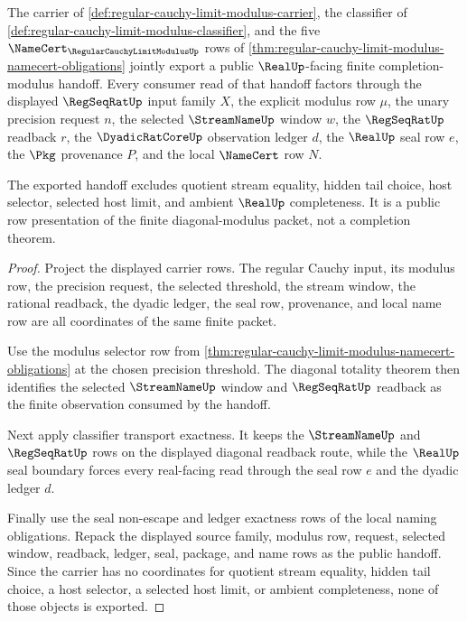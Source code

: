 \begin{theorem}
\label{thm:regular-cauchy-limit-modulus-public-realup-export}
The carrier of \autoref{def:regular-cauchy-limit-modulus-carrier}, the classifier of \autoref{def:regular-cauchy-limit-modulus-classifier}, and the five $\NameCert_{\RegularCauchyLimitModulusUp}$ rows of \autoref{thm:regular-cauchy-limit-modulus-namecert-obligations} jointly export a public $\RealUp$-facing finite completion-modulus handoff. Every consumer read of that handoff factors through the displayed $\RegSeqRatUp$ input family $X$, the explicit modulus row $\mu$, the unary precision request $n$, the selected $\StreamNameUp$ window $w$, the $\RegSeqRatUp$ readback $r$, the $\DyadicRatCoreUp$ observation ledger $d$, the $\RealUp$ seal row $e$, the $\Pkg$ provenance $P$, and the local $\NameCert$ row $N$.

The exported handoff excludes quotient stream equality, hidden tail choice, host selector, selected host limit, and ambient $\RealUp$ completeness. It is a public row presentation of the finite diagonal-modulus packet, not a completion theorem.
\end{theorem}
\begin{proof}
Project the displayed carrier rows. The regular Cauchy input, its modulus row, the precision request, the selected threshold, the stream window, the rational readback, the dyadic ledger, the seal row, provenance, and local name row are all coordinates of the same finite packet.

Use the modulus selector row from \autoref{thm:regular-cauchy-limit-modulus-namecert-obligations} at the chosen precision threshold. The diagonal totality theorem then identifies the selected $\StreamNameUp$ window and $\RegSeqRatUp$ readback as the finite observation consumed by the handoff.

Next apply classifier transport exactness. It keeps the $\StreamNameUp$ and $\RegSeqRatUp$ rows on the displayed diagonal readback route, while the $\RealUp$ seal boundary forces every real-facing read through the seal row $e$ and the dyadic ledger $d$.

Finally use the seal non-escape and ledger exactness rows of the local naming obligations. Repack the displayed source family, modulus row, request, selected window, readback, ledger, seal, package, and name rows as the public handoff. Since the carrier has no coordinates for quotient stream equality, hidden tail choice, a host selector, a selected host limit, or ambient completeness, none of those objects is exported.
\end{proof}

